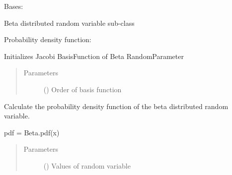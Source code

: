 \documentclass[letterpaper,10pt,english,openany,oneside]{sphinxmanual}
\begin{document}
\begin{fulllineitems}
\label{\detokenize{pygpc:pygpc.RandomParameter.Beta}}
Bases: {\hyperref[\detokenize{pygpc:pygpc.RandomParameter.RandomParameter}]{}}

Beta distributed random variable sub-class

Probability density function:

\begin{fulllineitems}
\label{\detokenize{pygpc:pygpc.RandomParameter.Beta.init_basis_function}}
Initializes Jacobi BasisFunction of Beta RandomParameter
\begin{quote}\begin{description}
\item[{Parameters}] \leavevmode
{} () \textendash{} Order of basis function

\end{description}\end{quote}

\end{fulllineitems}


\begin{fulllineitems}
\label{\detokenize{pygpc:pygpc.RandomParameter.Beta.pdf}}
Calculate the probability density function of the beta distributed random variable.

pdf = Beta.pdf(x)
\begin{quote}\begin{description}
\item[{Parameters}] \leavevmode
{} (\sphinxstyleliteralemphasis{\sphinxupquote{ {[}}}\sphinxstyleliteralemphasis{\sphinxupquote{{]}}}) \textendash{} Values of random variable


\end{description}
\end{quote}
\end{fulllineitems}
\end{fulllineitems}
\end{document}
